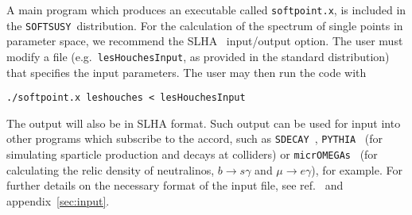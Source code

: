 \documentclass[]{article}
\def\SOFTSUSY{{\tt SOFTSUSY}}
\def\code#1{\small{\tt #1}\normalsize}
\begin{document}
A main program which produces an executable called
\code{softpoint.x}, is included in the
\SOFTSUSY~distribution. For the calculation of the spectrum of single points
in parameter space, we recommend the
SLHA~\cite{lhacc} input/output 
option. The user must modify a
file (e.g.\ \code{lesHouchesInput}, as provided in the standard distribution)
that specifies the input parameters. The user may then run the code with 
\small\begin{verbatim}
./softpoint.x leshouches < lesHouchesInput
\end{verbatim}\normalsize
The output will also be in
SLHA format. Such output can be used for input into other programs  
which subscribe to the accord, such as \code{SDECAY}~\cite{sdecay},
\code{PYTHIA}~\cite{pythia} (for 
simulating sparticle production and decays at colliders) or
\code{micrOMEGAs}~\cite{micromegas} (for
calculating the relic density of neutralinos, $b\rightarrow s \gamma$ and
$\mu \rightarrow e \gamma$), for example. For further details on the necessary
format of the input file, see ref.~\cite{lhacc} and appendix~\ref{sec:input}. 
\end{document}
